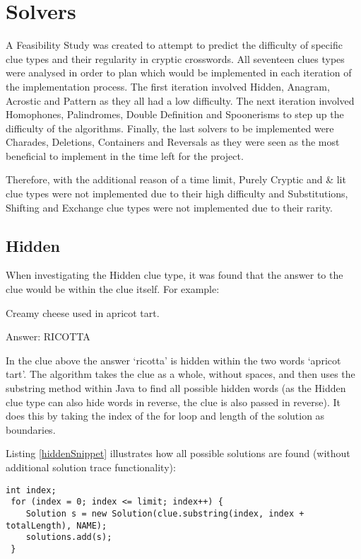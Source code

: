 \section{Solvers}
\label{sec:solvers}

A Feasibility Study was created to attempt to predict the difficulty of specific
clue types and their regularity in cryptic crosswords. All seventeen clues types
were analysed in order to plan which would be implemented in each iteration of
the implementation process. The first iteration involved Hidden, Anagram,
Acrostic and Pattern as they all had a low difficulty. The next iteration
involved Homophones, Palindromes, Double Definition and Spoonerisms to step up
the difficulty of the algorithms. Finally, the last solvers to be implemented
were Charades, Deletions, Containers and Reversals as they were seen as the most
beneficial to implement in the time left for the project.

Therefore, with the additional reason of a time limit,  Purely Cryptic and \&
lit clue types were not implemented due to their high difficulty and
Substitutions, Shifting and Exchange clue types were not implemented due to
their rarity.

\subsection{Hidden}

When investigating the Hidden clue type, it was found that the answer to the
clue would be within the clue itself. For example:

Creamy cheese used in apricot tart.

Answer: RICOTTA

In the clue above the answer `ricotta' is hidden within the two words `apricot
tart'. The algorithm takes the clue as a whole, without spaces, and then uses
the substring method  within Java to find all possible hidden words (as the
Hidden clue type can also hide words in reverse, the clue is also passed in
reverse). It does this by taking the index of the for loop and length of the
solution as boundaries.

Listing \ref{hiddenSnippet} illustrates how all possible solutions are found 
(without additional solution trace functionality):

\begin{lstlisting}[caption={Retrieving all possible solutions using the substring method in Java},
                   label=hiddenSnippet] 
 int index;
 for (index = 0; index <= limit; index++) {
	Solution s = new Solution(clue.substring(index, index + totalLength), NAME);
	solutions.add(s);
 }
\end{lstlisting}

